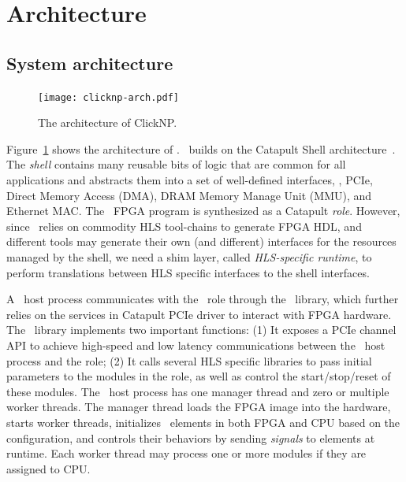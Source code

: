 \section{Architecture}
\label{sec:architecture}

\subsection{System architecture}
\label{subsec:sysarch}

\begin{figure}
\centering
\texttt{[image: clicknp-arch.pdf]}
\vspace{-30pt}
\caption{The architecture of ClickNP.}
\label{fig:clicknp}
\vspace{-10pt}
\end{figure}

Figure~\ref{fig:clicknp} shows the architecture of \name.
\name\ builds on the Catapult Shell architecture~\cite{putnam2014reconfigurable}.
The \textit{shell} contains many reusable bits of logic that are common for all applications 
and abstracts them into a set of well-defined interfaces,
\eg, PCIe, Direct Memory Access (DMA), DRAM Memory Manage Unit (MMU), 
and Ethernet MAC.
%
The \name\ FPGA program is synthesized as a Catapult \textit{role}.
%
However, since \name\ relies on commodity HLS tool-chains to generate FPGA HDL, 
and different tools may generate their own (and different) interfaces for the resources managed by the shell, 
we need a shim layer, called \textit{HLS-specific runtime}, to perform
translations between HLS specific interfaces to the shell interfaces. 

A \name\ host process communicates with the \name\ role through the \name\ library,
which further relies on the services in Catapult PCIe driver 
to interact with FPGA hardware.
The \name\ library implements two important functions: 
(1) It exposes a PCIe channel API to achieve high-speed and low latency communications 
between the \name\ host process and the role; 
(2) It calls several HLS specific libraries to pass initial parameters to
the modules in the role, as well as control the start/stop/reset of these 
modules.
%
The \name\ host process has one manager thread and zero or multiple 
worker threads.
%
The manager thread loads the FPGA image into the hardware, starts worker threads, 
initializes \name\ elements in both FPGA and CPU based on the configuration, 
and controls their behaviors by sending \textit{signals} to elements 
at runtime. 
%
Each worker thread may process one or more modules if they are assigned to CPU.

